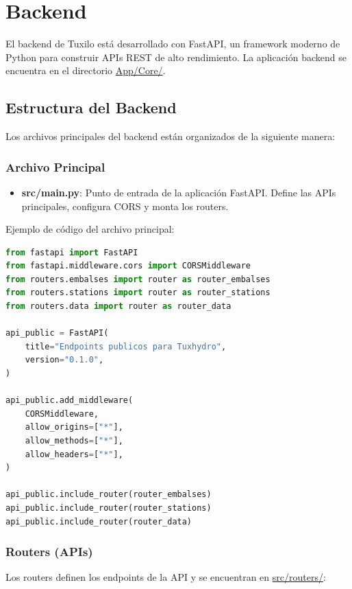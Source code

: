 \section{Backend}
\label{sec:chp5-backend}

El backend de Tuxilo está desarrollado con FastAPI, un framework moderno de Python para construir APIs REST de alto rendimiento. La aplicación backend se encuentra en el directorio \url{App/Core/}.

\subsection{Estructura del Backend}

Los archivos principales del backend están organizados de la siguiente manera:

\subsubsection{Archivo Principal}

\begin{itemize}
    \item \textbf{src/main.py}: Punto de entrada de la aplicación FastAPI. Define las APIs principales, configura CORS y monta los routers.
\end{itemize}

Ejemplo de código del archivo principal:

\begin{lstlisting}[language=python]
from fastapi import FastAPI
from fastapi.middleware.cors import CORSMiddleware
from routers.embalses import router as router_embalses
from routers.stations import router as router_stations
from routers.data import router as router_data

api_public = FastAPI(
    title="Endpoints publicos para Tuxhydro",
    version="0.1.0",
)

api_public.add_middleware(
    CORSMiddleware,
    allow_origins=["*"],
    allow_methods=["*"],
    allow_headers=["*"],
)

api_public.include_router(router_embalses)
api_public.include_router(router_stations)
api_public.include_router(router_data)
\end{lstlisting}

\subsubsection{Routers (APIs)}

Los routers definen los endpoints de la API y se encuentran en \url{src/routers/}:

